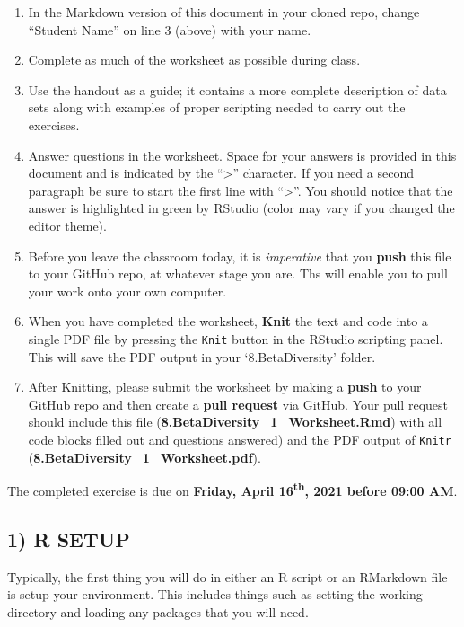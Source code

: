 \documentclass[
]{article}
\providecommand{\tightlist}{%
  \setlength{\itemsep}{0pt}\setlength{\parskip}{0pt}}
\begin{document}
\begin{enumerate}
\def\labelenumi{\arabic{enumi}.}
\tightlist
\item
  In the Markdown version of this document in your cloned repo, change
  ``Student Name'' on line 3 (above) with your name.
\item
  Complete as much of the worksheet as possible during class.
\item
  Use the handout as a guide; it contains a more complete description of
  data sets along with examples of proper scripting needed to carry out
  the exercises.
\item
  Answer questions in the worksheet. Space for your answers is provided
  in this document and is indicated by the ``\textgreater{}'' character.
  If you need a second paragraph be sure to start the first line with
  ``\textgreater{}''. You should notice that the answer is highlighted
  in green by RStudio (color may vary if you changed the editor theme).
\item
  Before you leave the classroom today, it is \emph{imperative} that you
  \textbf{push} this file to your GitHub repo, at whatever stage you
  are. Ths will enable you to pull your work onto your own computer.
\item
  When you have completed the worksheet, \textbf{Knit} the text and code
  into a single PDF file by pressing the \texttt{Knit} button in the
  RStudio scripting panel. This will save the PDF output in your
  `8.BetaDiversity' folder.
\item
  After Knitting, please submit the worksheet by making a \textbf{push}
  to your GitHub repo and then create a \textbf{pull request} via
  GitHub. Your pull request should include this file
  (\textbf{8.BetaDiversity\_1\_Worksheet.Rmd}) with all code blocks
  filled out and questions answered) and the PDF output of
  \texttt{Knitr}\\
  (\textbf{8.BetaDiversity\_1\_Worksheet.pdf}).
\end{enumerate}

The completed exercise is due on \textbf{Friday, April
16\textsuperscript{th}, 2021 before 09:00 AM}.

\hypertarget{r-setup}{%
\subsection{1) R SETUP}\label{r-setup}}

Typically, the first thing you will do in either an R script or an
RMarkdown file is setup your environment. This includes things such as
setting the working directory and loading any packages that you will
need.
\end{document}
